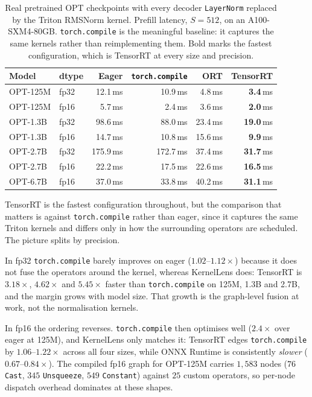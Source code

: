 \documentclass{article}
\begin{document}
\begin{table}[t]
\centering
\footnotesize
\begin{tabular}{llrrrr}
\toprule
Model & dtype & Eager & \texttt{torch.compile} & ORT & TensorRT \\
\midrule
OPT-125M & fp32 & 12.1\,ms & 10.9\,ms & 4.8\,ms & \textbf{3.4}\,ms \\
OPT-125M & fp16 & 5.7\,ms & 2.4\,ms & 3.6\,ms & \textbf{2.0}\,ms \\
OPT-1.3B & fp32 & 98.6\,ms & 88.0\,ms & 23.4\,ms & \textbf{19.0}\,ms \\
OPT-1.3B & fp16 & 14.7\,ms & 10.8\,ms & 15.6\,ms & \textbf{9.9}\,ms \\
OPT-2.7B & fp32 & 175.9\,ms & 172.7\,ms & 37.4\,ms & \textbf{31.7}\,ms \\
OPT-2.7B & fp16 & 22.2\,ms & 17.5\,ms & 22.6\,ms & \textbf{16.5}\,ms \\
OPT-6.7B & fp16 & 37.0\,ms & 33.8\,ms & 40.2\,ms & \textbf{31.1}\,ms \\
\bottomrule
\end{tabular}
\caption{Real pretrained OPT checkpoints with every decoder
\texttt{LayerNorm} replaced by the Triton RMSNorm kernel. Prefill latency,
$S{=}512$, on an A100-SXM4-80GB. \texttt{torch.compile} is the meaningful
baseline: it captures the same kernels rather than reimplementing them. Bold
marks the fastest configuration, which is TensorRT at every size and precision.}
\label{tab:real}
\end{table}

TensorRT is the fastest configuration throughout, but the comparison that
matters is against \texttt{torch.compile} rather than eager, since it captures
the same Triton kernels and differs only in how the surrounding operators are
scheduled. The picture splits by precision.

In fp32 \texttt{torch.compile} barely improves on eager ($1.02$--$1.12\times$)
because it does not fuse the operators around the kernel, whereas KernelLens
does: TensorRT is $3.18\times$, $4.62\times$ and $5.45\times$ faster than
\texttt{torch.compile} on 125M, 1.3B and 2.7B, and the margin grows with model
size. That growth is the graph-level fusion at work, not the normalisation
kernels.

In fp16 the ordering reverses. \texttt{torch.compile} then optimises well
($2.4\times$ over eager at 125M), and KernelLens only matches it: TensorRT
edges \texttt{torch.compile} by $1.06$--$1.22\times$ across all four sizes,
while ONNX Runtime is consistently \emph{slower} ($0.67$--$0.84\times$). The
compiled fp16 graph for OPT-125M carries $1{,}583$ nodes ($76$ \texttt{Cast},
$345$ \texttt{Unsqueeze}, $549$ \texttt{Constant}) against $25$ custom
operators, so per-node dispatch overhead dominates at these shapes.
\end{document}
